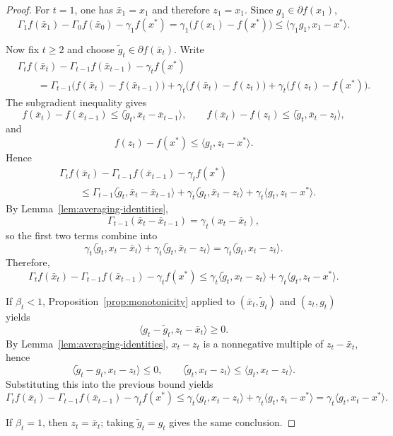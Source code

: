 \documentclass[11pt]{article}
\theoremstyle{definition}
\theoremstyle{remark}
\newcommand{\inner}[2]{\langle #1, #2 \rangle}
\begin{document}
\begin{proof}
For $t=1$, one has $\bar{x}_1=x_1$ and therefore $z_1=x_1$. Since $g_1 \in \partial f(x_1)$,
\[
    \Gamma_1 f(\bar{x}_1)-\Gamma_0 f(\bar{x}_0)-\gamma_1 f(x^*)
    =
    \gamma_1\bigl(f(x_1)-f(x^*)\bigr)
    \le
    \inner{\gamma_1 g_1}{x_1-x^*}.
\]

Now fix $t\ge 2$ and choose $\tilde g_t \in \partial f(\bar{x}_t)$. Write
\begin{align*}
    &\Gamma_t f(\bar{x}_t)-\Gamma_{t-1}f(\bar{x}_{t-1})-\gamma_t f(x^*) \\
    &\qquad =
    \Gamma_{t-1}\bigl(f(\bar{x}_t)-f(\bar{x}_{t-1})\bigr)
    +
    \gamma_t\bigl(f(\bar{x}_t)-f(z_t)\bigr)
    +
    \gamma_t\bigl(f(z_t)-f(x^*)\bigr).
\end{align*}
The subgradient inequality gives
\[
    f(\bar{x}_t)-f(\bar{x}_{t-1}) \le \inner{\tilde g_t}{\bar{x}_t-\bar{x}_{t-1}},
    \qquad
    f(\bar{x}_t)-f(z_t) \le \inner{\tilde g_t}{\bar{x}_t-z_t},
\]
and
\[
    f(z_t)-f(x^*) \le \inner{g_t}{z_t-x^*}.
\]
Hence
\begin{align*}
    &\Gamma_t f(\bar{x}_t)-\Gamma_{t-1}f(\bar{x}_{t-1})-\gamma_t f(x^*) \\
    &\qquad \le
    \Gamma_{t-1}\inner{\tilde g_t}{\bar{x}_t-\bar{x}_{t-1}}
    +
    \gamma_t\inner{\tilde g_t}{\bar{x}_t-z_t}
    +
    \gamma_t\inner{g_t}{z_t-x^*}.
\end{align*}
By Lemma~\ref{lem:averaging-identities},
\[
    \Gamma_{t-1}(\bar{x}_t-\bar{x}_{t-1}) = \gamma_t(x_t-\bar{x}_t),
\]
so the first two terms combine into
\[
    \gamma_t\inner{\tilde g_t}{x_t-\bar{x}_t}
    +
    \gamma_t\inner{\tilde g_t}{\bar{x}_t-z_t}
    =
    \gamma_t\inner{\tilde g_t}{x_t-z_t}.
\]
Therefore,
\[
    \Gamma_t f(\bar{x}_t)-\Gamma_{t-1}f(\bar{x}_{t-1})-\gamma_t f(x^*)
    \le
    \gamma_t\inner{\tilde g_t}{x_t-z_t}
    +
    \gamma_t\inner{g_t}{z_t-x^*}.
\]

If $\beta_t<1$, Proposition~\ref{prop:monotonicity} applied to $(\bar{x}_t,\tilde g_t)$ and $(z_t,g_t)$ yields
\[
    \inner{g_t-\tilde g_t}{z_t-\bar{x}_t} \ge 0.
\]
By Lemma~\ref{lem:averaging-identities}, $x_t-z_t$ is a nonnegative multiple of $z_t-\bar{x}_t$, hence
\[
    \inner{\tilde g_t-g_t}{x_t-z_t} \le 0,
    \qquad
    \inner{\tilde g_t}{x_t-z_t} \le \inner{g_t}{x_t-z_t}.
\]
Substituting this into the previous bound yields
\[
    \Gamma_t f(\bar{x}_t)-\Gamma_{t-1}f(\bar{x}_{t-1})-\gamma_t f(x^*)
    \le
    \gamma_t\inner{g_t}{x_t-z_t}
    +
    \gamma_t\inner{g_t}{z_t-x^*}
    =
    \gamma_t\inner{g_t}{x_t-x^*}.
\]

If $\beta_t=1$, then $z_t=\bar{x}_t$; taking $\tilde g_t=g_t$ gives the same conclusion.
\end{proof}
\end{document}
